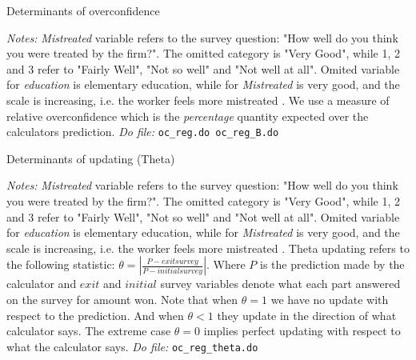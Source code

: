 \documentclass[11pt]{article}
\begin{document}



\begin{landscape}
\begin{table}[H]
\caption{Determinants of overconfidence}
\label{Table_determinantsOC}
\begin{center}
\scriptsize{}
\end{center}
 \footnotesize
\textit{Notes:} 
\emph{Mistreated} variable refers to the survey question: "How well do you think you were treated by the firm?". The omitted category is "Very Good", while 1, 2 and 3 refer to "Fairly Well", "Not so well" and "Not well at all".
Omited variable for \emph{education} is elementary education, while for \emph{Mistreated} is very good, and the scale is increasing, i.e. the worker feels more mistreated . We use a measure of relative overconfidence which is the \textit{percentage} quantity expected over the calculators prediction.
\textit{Do file: } \texttt{oc\_reg.do oc\_reg\_B.do}
\end{table}

\pagebreak

\begin{table}[H]
\caption{Determinants of updating (Theta)}
\label{Table_determinants_updating}
\begin{center}
\scriptsize{}
\end{center}
 \footnotesize
\textit{Notes:} 
\emph{Mistreated} variable refers to the survey question: "How well do you think you were treated by the firm?". The omitted category is "Very Good", while 1, 2 and 3 refer to "Fairly Well", "Not so well" and "Not well at all".
Omited variable for \emph{education} is elementary education, while for \emph{Mistreated} is very good, and the scale is increasing, i.e. the worker feels more mistreated . Theta updating refers to the following statistic: $\theta=\left|\frac{P-exitsurvey}{P-initialsurvey}\right|$. Where $P$ is the prediction made by the calculator and $exit$ and $initial$ survey variables denote what each part answered on the survey for amount won. Note that when $\theta=1$ we have no update with respect to the prediction. And when $\theta<1$ they update in the direction of what calculator says. The extreme case $\theta=0$ implies perfect updating with respect to what the calculator says. 
\textit{Do file: } \texttt{oc\_reg\_theta.do}
\end{table}



\end{landscape}
\end{document}
